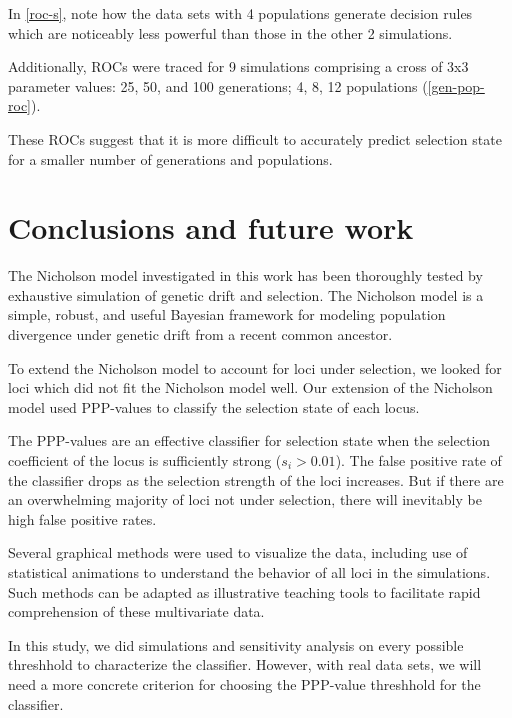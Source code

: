 \documentclass[a4paper,12pt]{article}
\begin{document}
In \autoref{roc-s}, note how the data sets with 4 populations generate
decision rules which are noticeably less powerful than those in the
other 2 simulations.

Additionally, ROCs were traced for 9 simulations comprising a cross of
3x3 parameter values: 25, 50, and 100 generations; 4, 8, 12
populations (\autoref{gen-pop-roc}).


These ROCs suggest that it is more difficult to accurately predict
selection state for a smaller number of generations and populations.

\section{Conclusions and future work}

The Nicholson model investigated in this work has been thoroughly
tested by exhaustive simulation of genetic drift and selection. The
Nicholson model is a simple, robust, and useful Bayesian framework for
modeling population divergence under genetic drift from a recent
common ancestor.

To extend the Nicholson model to account for loci under selection, we
looked for loci which did not fit the Nicholson model well. Our
extension of the Nicholson model used PPP-values to classify the
selection state of each locus.

The PPP-values are an effective classifier for selection state when
the selection coefficient of the locus is sufficiently strong
($s_i>0.01$). The false positive rate of the classifier drops as the
selection strength of the loci increases. But if there are an
overwhelming majority of loci not under selection, there will
inevitably be high false positive rates.

Several graphical methods were used to visualize the data, including
use of statistical animations to understand the behavior of all loci
in the simulations. Such methods can be adapted as illustrative
teaching tools to facilitate rapid comprehension of these multivariate
data.

In this study, we did simulations and sensitivity analysis on every
possible threshhold to characterize the classifier. However, with real
data sets, we will need a more concrete criterion for choosing the
PPP-value threshhold for the classifier.
\end{document}
